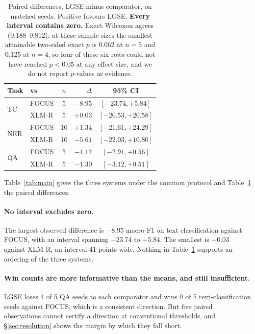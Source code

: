 \documentclass[11pt]{article}
\begin{document}
\begin{table}[t]
\centering
\small
\begin{tabular}{llcrc}
\toprule
Task & vs & $n$ & $\Delta$ & 95\% CI \\
\midrule
\multirow{2}{*}{TC}  & FOCUS & 5  & $-8.95$ & $[-23.74, +5.84]$ \\
                     & XLM-R & 5  & $+0.03$ & $[-20.53, +20.58]$ \\
\midrule
\multirow{2}{*}{NER} & FOCUS & 10 & $+1.34$ & $[-21.61, +24.29]$ \\
                     & XLM-R & 10 & $-5.61$ & $[-22.03, +10.80]$ \\
\midrule
\multirow{2}{*}{QA}  & FOCUS & 5  & $-1.17$ & $[-2.91, +0.56]$ \\
                     & XLM-R & 5  & $-1.30$ & $[-3.12, +0.51]$ \\
\bottomrule
\end{tabular}
\caption{Paired differences, LGSE minus comparator, on matched seeds.
Positive favours LGSE. \textbf{Every interval contains zero.} Exact
Wilcoxon agrees (0.188--0.812); at these sample sizes the smallest
attainable two-sided exact $p$ is 0.062 at $n=5$ and 0.125 at $n=4$, so four
of these six rows could not have reached $p<0.05$ at any effect size, and we
do not report $p$-values as evidence.}
\label{tab:paired}
\end{table}

Table~\ref{tab:main} gives the three systems under the common protocol and
Table~\ref{tab:paired} the paired differences.

\paragraph{No interval excludes zero.} The largest observed difference is
$-8.95$ macro-F1 on text classification against FOCUS, with an interval
spanning $-23.74$ to $+5.84$. The smallest is $+0.03$ against XLM-R, an
interval 41 points wide. Nothing in Table~\ref{tab:paired} supports an
ordering of the three systems.

\paragraph{Win counts are more informative than the means, and still
insufficient.} LGSE loses 4 of 5 QA seeds to each comparator and wins 0 of 5
text-classification seeds against FOCUS, which is a consistent direction.
But five paired observations cannot certify a direction at conventional
thresholds, and \S\ref{sec:resolution} shows the margin by which they fall
short.
\end{document}
